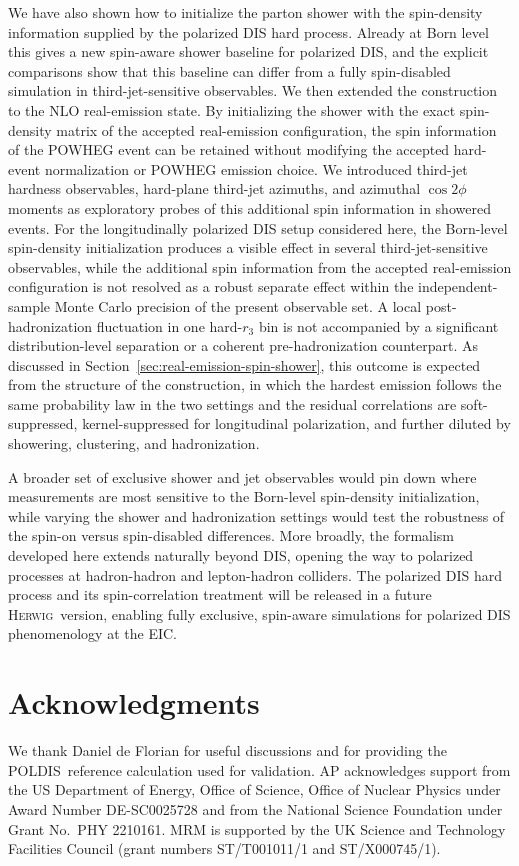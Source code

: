 \documentclass[a4paper,11pt]{article}
\newcommand{\Herwig}{\textsc{Herwig}}
\newcommand{\POLDIS}{\textsc{POLDIS}}
\begin{document}
We have also shown how to initialize the parton shower with the spin-density
information supplied by the polarized DIS hard process. Already at Born level
this gives a new spin-aware shower baseline for polarized DIS, and the explicit
comparisons show that this baseline can differ from a fully spin-disabled
simulation in third-jet-sensitive observables. We then extended the construction
to the NLO real-emission state. By initializing the shower with the exact
spin-density matrix of the accepted real-emission configuration, the spin
information of the POWHEG event can be retained without modifying the accepted
hard-event normalization or POWHEG emission choice. We introduced third-jet
hardness observables, hard-plane third-jet azimuths, and azimuthal
$\cos 2\phi$ moments as exploratory probes of this additional spin information
in showered events. For the longitudinally polarized DIS setup considered here,
the Born-level spin-density initialization produces a visible effect in several
third-jet-sensitive observables, while the additional spin information from the
accepted real-emission configuration is not resolved as a robust separate
effect within the independent-sample Monte Carlo precision of the present
observable set. A local post-hadronization fluctuation in one hard-$r_3$ bin is
not accompanied by a significant distribution-level separation or a coherent
pre-hadronization counterpart.
As discussed in Section~\ref{sec:real-emission-spin-shower}, this outcome
is expected from the structure of the construction, in which the hardest
emission follows the same probability law in the two settings and the residual
correlations are soft-suppressed, kernel-suppressed for longitudinal
polarization, and further diluted by showering, clustering, and hadronization.

A broader set of exclusive shower and jet observables would pin down where
measurements are most sensitive to the Born-level spin-density initialization,
while varying the shower and hadronization settings would test the robustness
of the spin-on versus spin-disabled differences. More broadly, the formalism
developed here extends naturally beyond DIS, opening the way to polarized
processes at hadron-hadron and lepton-hadron colliders. The polarized DIS hard
process and its spin-correlation treatment will be released in a future
\Herwig\ version, enabling fully exclusive, spin-aware simulations for
polarized DIS phenomenology at the EIC.

\section*{Acknowledgments}
We thank Daniel de Florian for useful discussions and for providing the \POLDIS\ reference calculation used for validation. AP acknowledges support from the US Department of Energy, Office of Science, Office of Nuclear Physics under Award Number DE-SC0025728 and from the National Science Foundation under Grant No.\ PHY 2210161.
MRM is supported by the UK Science and Technology Facilities Council (grant numbers ST/T001011/1 and ST/X000745/1).
\end{document}

